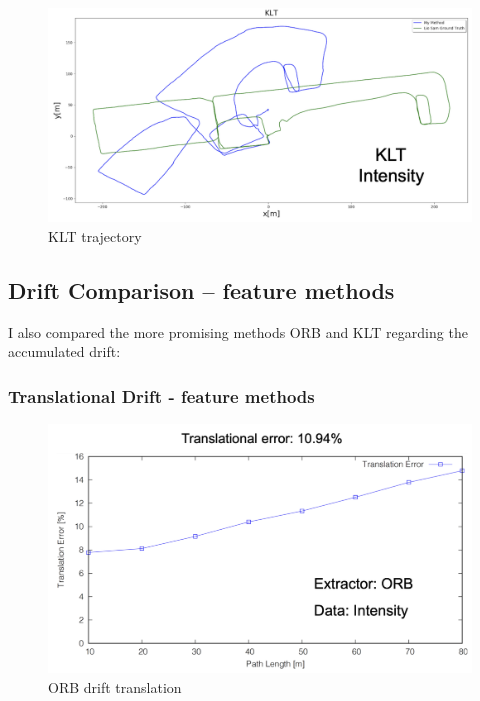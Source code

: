 {{{        \begin{figure}[!ht]
            \centering
            \includegraphics[scale = 0.5]{images/comparison_appendix/KLTt.png}
            \caption{KLT trajectory}
            \label{fig:KLT_trajectory_method}
        \end{figure}
        }
        \clearpage
        \subsection{Drift Comparison – feature methods}{
            I also compared the more promising methods ORB and KLT regarding the accumulated drift:
            \subsubsection{Translational Drift - feature methods}{
                \begin{figure}[!ht]
                    \centering
                    \includegraphics[scale = 0.4]{images/comparison_appendix/orb_drift_transl.png}
                    \caption{ORB drift translation}
                    \label{fig:ORB_drift_transl}
                \end{figure}

}}}}

